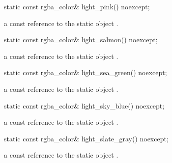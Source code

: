\begin{itemdecl}
    static const rgba_color& light_pink() noexcept;
\end{itemdecl}
\begin{itemdescr}
    \pnum
    \returns
    a const reference to the static  object .
\end{itemdescr}

\begin{itemdecl}
    static const rgba_color& light_salmon() noexcept;
\end{itemdecl}
\begin{itemdescr}
    \pnum
    \returns
    a const reference to the static  object .
\end{itemdescr}

\begin{itemdecl}
    static const rgba_color& light_sea_green() noexcept;
\end{itemdecl}
\begin{itemdescr}
    \pnum
    \returns
    a const reference to the static  object .
\end{itemdescr}

\begin{itemdecl}
    static const rgba_color& light_sky_blue() noexcept;
\end{itemdecl}
\begin{itemdescr}
    \pnum
    \returns
    a const reference to the static  object .
\end{itemdescr}

\begin{itemdecl}
    static const rgba_color& light_slate_gray() noexcept;
\end{itemdecl}
\begin{itemdescr}
    \pnum
    \returns
    a const reference to the static  object .
\end{itemdescr}

